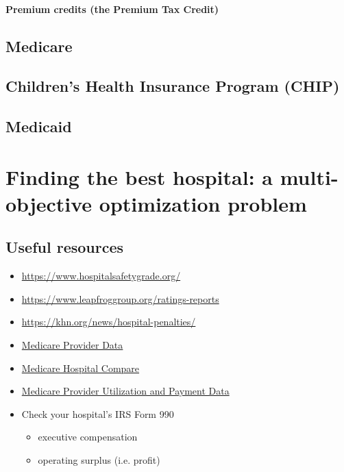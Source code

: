 \documentclass{article}
\begin{document}
\paragraph{Premium credits (the Premium Tax Credit)}

\subsection{Medicare}

\subsection{Children's Health Insurance Program (CHIP)}

\subsection{Medicaid}


\section{Finding the best hospital: a multi-objective optimization problem}

\subsection{Useful resources}

\begin{itemize}
\item \url{https://www.hospitalsafetygrade.org/}
\item \url{https://www.leapfroggroup.org/ratings-reports}
\item \url{https://khn.org/news/hospital-penalties/}
\item \href{https://data.cms.gov/provider-data/}{Medicare Provider Data}
\item \href{https://www.medicare.gov/care-compare/}{Medicare Hospital Compare}
\item \href{https://www.cms.gov/Research-Statistics-Data-and-Systems/Statistics-Trends-and-Reports/Medicare-Provider-Charge-Data}{Medicare Provider Utilization and Payment Data}
\item Check your hospital's IRS Form 990
\begin{itemize}
  \item executive compensation
  \item operating surplus (i.e. profit)
\end{itemize}
\end{itemize}
\end{document}
